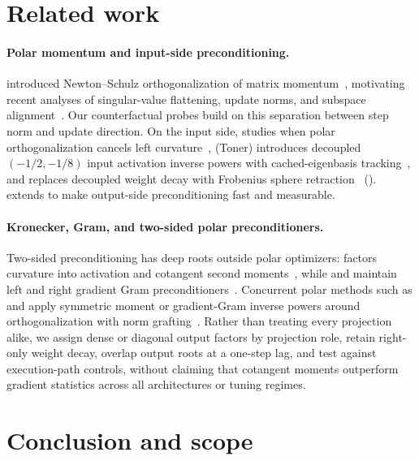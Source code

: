 \FloatBarrier
\section{Related work}
\label{sec:related}

\paragraph{Polar momentum and input-side preconditioning.}
 introduced Newton--Schulz orthogonalization of matrix momentum~\citep{jordan2024muon}, motivating recent analyses of singular-value flattening, update norms, and subspace alignment~\citep{shumaylov2026freon,goyal2026spectrally}. Our counterfactual probes build on this separation between step norm and update direction. On the input side,  studies when polar orthogonalization cancels left curvature~\citep{du2026newtonmuon},  (Toner) introduces decoupled $(-1/2,-1/8)$ input activation inverse powers with cached-eigenbasis tracking~\citep{mohamadi2026toner}, and  replaces decoupled weight decay with Frobenius sphere retraction~\citep{wen2026hyperball} ().  extends  to make output-side preconditioning fast and measurable.

\paragraph{Kronecker, Gram, and two-sided polar preconditioners.}
Two-sided preconditioning has deep roots outside polar optimizers:  factors curvature into activation and cotangent second moments~\citep{martens2015kfac}, while  and  maintain left and right gradient Gram preconditioners~\citep{gupta2018shampoo,anil2020scalable,vyas2024soap}. Concurrent polar methods such as  and  apply symmetric moment or gradient-Gram inverse powers around orthogonalization with norm grafting~\citep{che2026gomuon,zhang2026mousse}. Rather than treating every projection alike, we assign dense or diagonal output factors by projection role, retain right-only weight decay, overlap output roots at a one-step lag, and test against execution-path controls, without claiming that cotangent moments outperform gradient statistics across all architectures or tuning regimes.

\section{Conclusion and scope}
\label{sec:conclusion}

